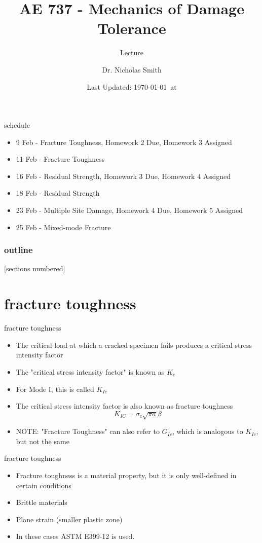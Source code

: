 \documentclass[10pt]{beamer}
\title{AE 737 - Mechanics of Damage Tolerance}
\subtitle{Lecture \arabic{lecture}}
\date{Last Updated: \today\ at \DTMcurrenttime}
\author{Dr. Nicholas Smith}
\institute{Wichita State University, Department of Aerospace Engineering}
\begin{document}
\maketitle
\begin{frame}{schedule}
	\begin{itemize}
		\item 9 Feb - Fracture Toughness, Homework 2 Due, Homework 3 Assigned
		\item 11 Feb - Fracture Toughness
		\item 16 Feb - Residual Strength, Homework 3 Due, Homework 4 Assigned
		\item 18 Feb - Residual Strength
		\item 23 Feb - Multiple Site Damage, Homework 4 Due, Homework 5 Assigned
		\item 25 Feb - Mixed-mode Fracture
	\end{itemize}
\end{frame}

\begin{frame}
  \frametitle{outline}
  [sections numbered]
  \tableofcontents[hideallsubsections]
\end{frame}

\section{fracture toughness}

\begin{frame}{fracture toughness}
	\begin{itemize}
		\item The critical load at which a cracked specimen fails produces a critical stress intensity factor
		\item The "critical stress intensity factor" is known as $K_c$
		\item For Mode I, this is called $K_{Ic}$
		\item The critical stress intensity factor is also known as fracture toughness
		\begin{equation}
		K_{IC} = \sigma_c \sqrt{\pi a}\beta
		\end{equation}
		\pause
		\item NOTE: "Fracture Toughness" can also refer to $G_{Ic}$, which is analogous to $K_{Ic}$, but not the same
	\end{itemize}
\end{frame}

\begin{frame}{fracture toughness}
	\begin{itemize}
		\item Fracture toughness is a material property, but it is only well-defined in certain conditions
		\item Brittle materials
		\item Plane strain (smaller plastic zone)
		\item In these cases ASTM E399-12 is used.
	\end{itemize}
\end{frame}
\end{document}
